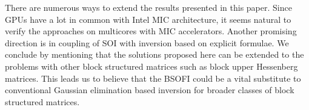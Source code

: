 \documentclass{llncs}
\begin{document}
There are numerous ways to extend the results presented in this paper.
Since GPUs have a lot in common with Intel MIC architecture, 
it seems natural to verify the approaches
on multicores with MIC accelerators.
%
Another promising direction is in coupling of 
SOI with inversion based on explicit formulae. 
%
We conclude by mentioning 
that the solutions proposed here can be extended to 
the problems with other block structured matrices such as
block upper Hessenberg matrices. 
This leads us to believe that the BSOFI could be a vital substitute 
to conventional Gaussian elimination based inversion
for broader classes of block structured matrices.



\end{document}
